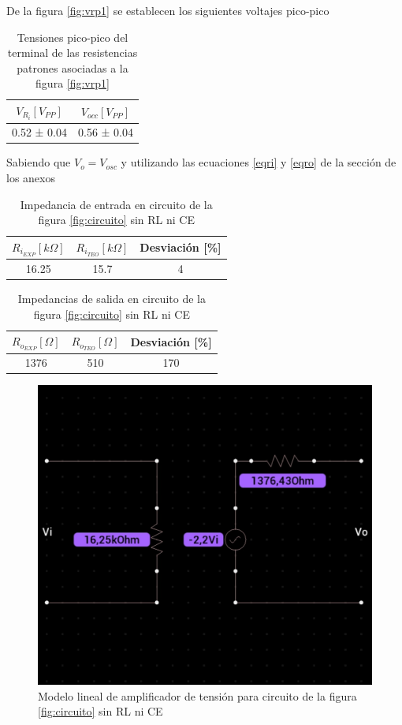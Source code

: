\documentclass[12pt, a4paper]{article}
\begin{document}
    \newpage

    De la figura \ref{fig:vrp1} se establecen los siguientes voltajes pico-pico

    \begin{table}[h!]
        \centering
        \caption{Tensiones pico-pico del terminal de las resistencias patrones asociadas a la figura \ref{fig:vrp1}}
        \label{tab:vrp1}
        \begin{tabular}{|c|c|} \hline
            $V_{R_i} [V_{PP}]$  &   $V_{occ} [V_{PP}]$  \\ \hline
            0.52 ± 0.04         &   0.56 ± 0.04    \\ \hline
        \end{tabular}
    \end{table}

    Sabiendo que $V_o = V_{osc}$ y utilizando las ecuaciones \eqref{eqri} y \eqref{eqro} de la sección de los anexos

    \begin{table}[h!]
        \centering
        \caption{Impedancia de entrada en circuito de la figura \ref{fig:circuito} sin RL ni CE}
        \label{tab:rpi1}
        \begin{tabular}{|c|c|c|} \hline
            $R_{i_{EXP}} [k\Omega]$  &   $R_{i_{TEO}} [k\Omega]$ & Desviación [\%]  \\ \hline
            16.25         &   15.7   & 4 \\ \hline
        \end{tabular}
    \end{table}

    \begin{table}[h!]
        \centering
        \caption{Impedancias de salida en circuito de la figura \ref{fig:circuito} sin RL ni CE}
        \label{tab:rpo1}
        \begin{tabular}{|c|c|c|} \hline
            $R_{o_{EXP}} [\Omega]$  &   $R_{o_{TEO}} [\Omega]$ & Desviación [\%]  \\ \hline
            1376         &   510   & 170 \\ \hline
        \end{tabular}
    \end{table}

    \begin{figure}
        \centering
        \includegraphics[height=5cm\textwidth]{ma1.jpg}
        \caption{Modelo lineal de amplificador de tensión para circuito de la figura \ref{fig:circuito} sin RL ni CE}
        \label{fig:ma1}
    \end{figure}
\end{document}
